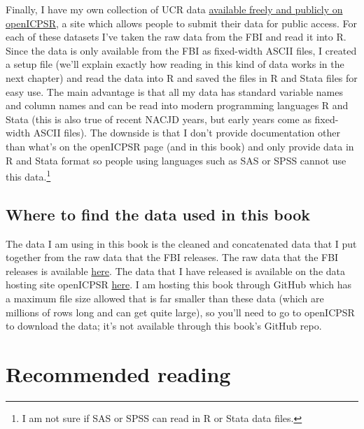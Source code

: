 \documentclass[
  12pt,
  openany]{book}
\begin{document}
Finally, I have my own collection of UCR data \href{https://doi.org/10.3886/E118281V3}{available freely and publicly on openICPSR}, a site which allows people to submit their data for public access. For each of these datasets I've taken the raw data from the FBI and read it into R. Since the data is only available from the FBI as fixed-width ASCII files, I created a setup file (we'll explain exactly how reading in this kind of data works in the next chapter) and read the data into R and saved the files in R and Stata files for easy use. The main advantage is that all my data has standard variable names and column names and can be read into modern programming languages R and Stata (this is also true of recent NACJD years, but early years come as fixed-width ASCII files). The downside is that I don't provide documentation other than what's on the openICPSR page (and in this book) and only provide data in R and Stata format so people using languages such as SAS or SPSS cannot use this data.\footnote{I am not sure if SAS or SPSS can read in R or Stata data files.}

\hypertarget{where-to-find-the-data-used-in-this-book}{%
\subsection{Where to find the data used in this book}\label{where-to-find-the-data-used-in-this-book}}

The data I am using in this book is the cleaned and concatenated data that I put together from the raw data that the FBI releases. The raw data that the FBI releases is available \href{https://crime-data-explorer.fr.cloud.gov/pages/downloads}{here}. The data that I have released is available on the data hosting site openICPSR \href{https://doi.org/10.3886/E118281V3}{here}. I am hosting this book through GitHub which has a maximum file size allowed that is far smaller than these data (which are millions of rows long and can get quite large), so you'll need to go to openICPSR to download the data; it's not available through this book's GitHub repo.

\hypertarget{recommended-reading}{%
\section{Recommended reading}\label{recommended-reading}}
\end{document}
